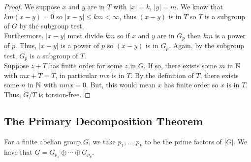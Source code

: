 \begin{proof}
    We suppose $x$ and $y$ are in $T$ with $|x| = k$, $|y| = m$.
    We know that \linebreak $km(x - y) = 0$ so $|x - y| \leq km < \infty$,
    thus $(x - y)$ is in $T$ so $T$ is a subgroup of $G$ by the subgroup test. 
    \\[\baselineskip]
    Furthermore,
    $|x - y|$ must divide $km$ so if $x$ and $y$ are in $G_p$
    then $km$ is a power of $p$. Thus, $|x - y|$ is a
    power of $p$ so $(x - y)$ is in $G_p$. Again, by the subgroup test,
    $G_p$ is a subgroup of $T$.
    \\[\baselineskip]
    Suppose $z + T$ has finite order for some $z$ in $G$. If so,
    there exists some $m$ in $\mathbb{N}$ with $mx + T = T$, in particular 
    $mx$ is in $T$. By the definition of $T$, there exists some $n$
    in $\mathbb{N}$ with $nmx = 0$. But, this would mean $x$ has finite order
    so $x$ is in $T$. Thus, $G / T$ is torsion-free.
\end{proof}

\subsection{The Primary Decomposition Theorem}

For a finite abelian group $G$, we take $p_1, \ldots, p_k$ to be the
prime factors of $|G|$. We have that $G = G_{p_1} \oplus \cdots \oplus
G_{p_k}$.

